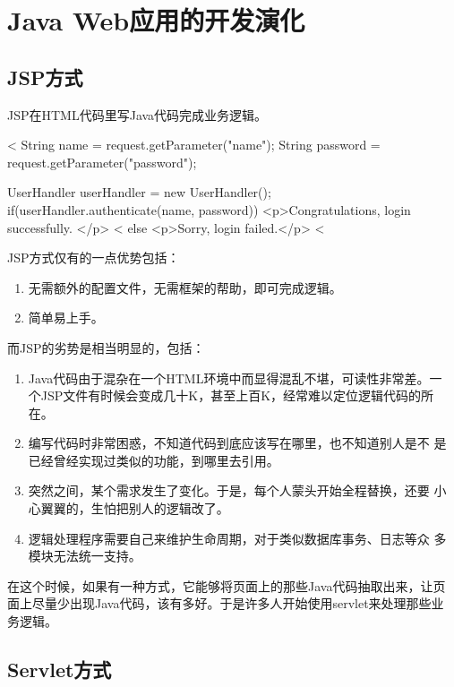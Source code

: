 
\section{Java Web应用的开发演化}

\subsection{JSP方式}

JSP在HTML代码里写Java代码完成业务逻辑。

\begin{xmlCode}
<%
     String name = request.getParameter("name");
     String password = request.getParameter("password");

     UserHandler userHandler = new UserHandler();
     if(userHandler.authenticate(name, password)) {
<p>Congratulations, login successfully. </p>
<%
      } else {
<p>Sorry, login failed.</p>
<%
      }
\end{xmlCode}

JSP方式仅有的一点优势包括：

\begin{enumerate}
\item 无需额外的配置文件，无需框架的帮助，即可完成逻辑。
\item 简单易上手。
\end{enumerate}

而JSP的劣势是相当明显的，包括：

\begin{enumerate}
\item Java代码由于混杂在一个HTML环境中而显得混乱不堪，可读性非常差。一
个JSP文件有时候会变成几十K，甚至上百K，经常难以定位逻辑代码的所在。
\item 编写代码时非常困惑，不知道代码到底应该写在哪里，也不知道别人是不
是已经曾经实现过类似的功能，到哪里去引用。
\item 突然之间，某个需求发生了变化。于是，每个人蒙头开始全程替换，还要
小心翼翼的，生怕把别人的逻辑改了。
\item 逻辑处理程序需要自己来维护生命周期，对于类似数据库事务、日志等众
多模块无法统一支持。
\end{enumerate}


在这个时候，如果有一种方式，它能够将页面上的那些Java代码抽取出来，让页
面上尽量少出现Java代码，该有多好。于是许多人开始使用servlet来处理那些业
务逻辑。

\subsection{Servlet方式}

